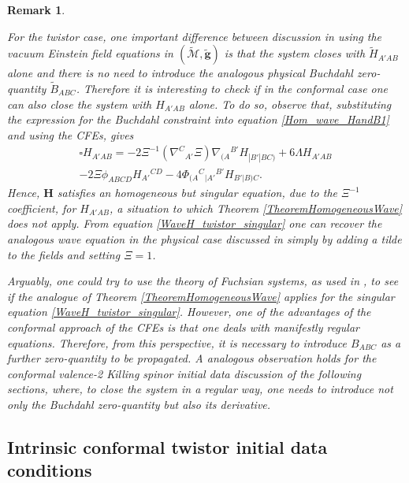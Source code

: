 \documentclass[10pt,a4paper]{article}
\theoremstyle{plain}
\newtheorem{remark}{Remark}
\def\bmg{{\bm g}}
\def\bmH{{\bm H}}
\begin{document}
\begin{remark}
\em{
For the twistor case, one important difference between discussion in
\cite{GasVal15}
using the vacuum Einstein field equations in  $(\tilde{\mathcal{M}},\tilde{\bmg})$
is that the system closes with $\tilde{H}_{A'AB}$ alone and there is no need
to introduce the analogous physical Buchdahl zero-quantity $\tilde{B}_{ABC}$.
Therefore it is interesting to check if in the conformal case
one can also close the system with $H_{A'AB}$ alone.
To do so, observe that, substituting the expression for
the Buchdahl constraint into equation
\eqref{Hom_wave_HandB1} and using the CFEs, gives
\begin{multline}\label{WaveH_twistor_singular}
  \square H_{A'AB} =  - 2\Xi^{-1} (\nabla^{C}{}_{A'}\Xi)
    \nabla_{(A}{}^{B'}H_{|B'|BC)}+ 6 \Lambda H_{A'AB} \\-2 \Xi
  \phi _{ABCD}H_{A'}{}^{CD} -4
  \Phi_{(A}{}^{C}{}_{|A'}{}^{B'}H_{B'|B)C}.
\end{multline}
Hence, $\bmH$ satisfies  an homogeneous but
\emph{singular equation}, due to the $\Xi^{-1}$ coefficient,
for $H_{A'AB}$, a situation to which Theorem
\ref{TheoremHomogeneousWave} does not apply.
From equation \eqref{WaveH_twistor_singular} one can
recover the analogous wave equation in the physical case
discussed in \cite{GasVal15} simply by adding a tilde to the fields and
setting $\Xi=1$.

Arguably, one could try
to use the theory of \textit{Fuchsian systems}, as used in \cite{ChrPaetz13,Pae14a}, to see if the analogue of
Theorem \ref{TheoremHomogeneousWave} applies for the singular equation
\eqref{WaveH_twistor_singular}.  However, one of the advantages of the
conformal approach of the CFEs is that one deals with manifestly regular equations.
Therefore, from this perspective, it is necessary to introduce $B_{ABC}$ as a further zero-quantity to
be propagated.  A analogous observation holds for the conformal valence-2
Killing spinor initial data discussion of the following sections,
where, to close the system in a regular way, one needs to introduce not
only the Buchdahl zero-quantity but also its derivative.}
\end{remark}


\subsection{Intrinsic conformal twistor initial data conditions}
\end{document}
